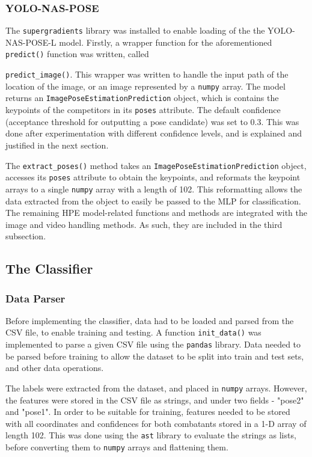 \documentclass[a4paper, oneside, 11pt]{article}
\begin{document}
\subsubsection{YOLO-NAS-POSE}

The \texttt{supergradients} library was installed to enable loading of the the YOLO-NAS-POSE-L model. Firstly, a wrapper function for the aforementioned \texttt{predict()} function was written, called 

\noindent
\texttt{predict\_image()}. This wrapper was written to handle the input path of the location of the image, or an image represented by a \texttt{numpy} array. The model returns an \texttt{ImagePoseEstimationPrediction} object, which is contains the keypoints of the competitors in its \texttt{poses} attribute. The default confidence (acceptance threshold for outputting a pose candidate) was set to 0.3. This was done after experimentation with different confidence levels, and is explained and justified in the next section.

\bigskip
\noindent
The \texttt{extract\_poses()} method takes an \texttt{ImagePoseEstimationPrediction} object, accesses its \texttt{poses} attribute to obtain the keypoints, and reformats the keypoint arrays to a single \texttt{numpy} array with a length of 102. This reformatting allows the data extracted from the object to easily be passed to the MLP for classification. The remaining HPE model-related functions and methods are integrated with the image and video handling methods. As such, they are included in the third subsection.

\subsection{The Classifier}

\subsubsection{Data Parser}

Before implementing the classifier, data had to be loaded and parsed from the CSV file, to enable training and testing. A function \texttt{init\_data()} was implemented to parse a given CSV file using the \texttt{pandas} library. Data needed to be parsed before training to allow the dataset to be split into train and test sets, and other data operations.

\bigskip
\noindent
The labels were extracted from the dataset, and placed in \texttt{numpy} arrays. However, the features were stored in the CSV file as strings, and under two fields - "pose2" and "pose1". In order to be suitable for training, features needed to be stored with all coordinates and confidences for both combatants stored in a 1-D array of length 102. This was done using the \texttt{ast} library to evaluate the strings as lists, before converting them to \texttt{numpy} arrays and flattening them.
\end{document}
